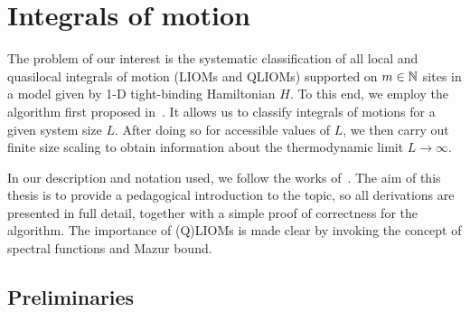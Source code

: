 \chapter{Integrals of motion}
\thispagestyle{chapterBeginStyle}

The problem of our interest is the systematic classification of all local and quasilocal integrals of
motion (LIOMs and QLIOMs) supported on \( m \in \mathbb{N} \) sites in a model given by 1-D tight-binding Hamiltonian \(H\). 
To this end, we employ the algorithm first proposed in~\textcite{Mierzejewski2015a}. It allows us to classify integrals
of motions for a given system size \(L\). After doing so for accessible values of \(L\), we then carry out finite size scaling
to obtain information about the thermodynamic limit \(L \to \infty \). 

In our description and notation used, we follow
the works of~\textcite{Mierzejewski2015a,Mierzejewski2015Approx,Mierzejewski2018}.
The aim of this thesis is to provide a pedagogical introduction to the topic,
so all derivations are presented in full detail, together with a simple proof of correctness for the algorithm.
The importance of (Q)LIOMs is made clear by invoking the concept of spectral functions and Mazur bound. 
\section{Preliminaries\label{sec:prelim}}

